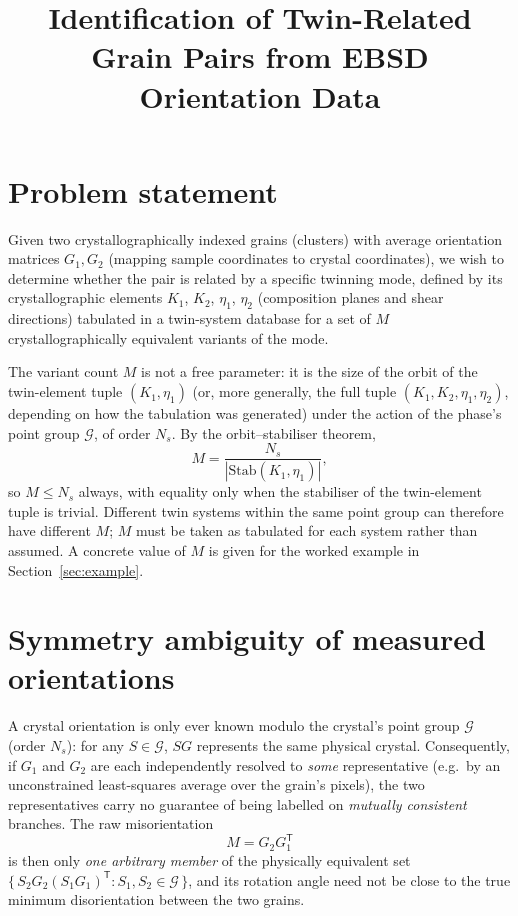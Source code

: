 \documentclass[11pt]{article}
\title{Identification of Twin-Related Grain Pairs from EBSD Orientation Data}
\author{}
\date{}
\newcommand{\Kone}{K_1}
\newcommand{\Ktwo}{K_2}
\newcommand{\etaone}{\eta_1}
\newcommand{\etatwo}{\eta_2}
\begin{document}
\maketitle

\section{Problem statement}

Given two crystallographically indexed grains (clusters) with average
orientation matrices $G_1, G_2$ (mapping sample coordinates to crystal
coordinates), we wish to determine whether the pair is related by a
specific twinning mode, defined by its crystallographic elements
$\Kone$, $\Ktwo$, $\etaone$, $\etatwo$ (composition planes and shear
directions) tabulated in a twin-system database for a set of $M$
crystallographically equivalent variants of the mode.

The variant count $M$ is not a free parameter: it is the size of the
orbit of the twin-element tuple $(\Kone,\etaone)$ (or, more generally,
the full tuple $(\Kone,\Ktwo,\etaone,\etatwo)$, depending on how the
tabulation was generated) under the action of the phase's point group
$\mathcal G$, of order $N_s$. By the orbit--stabiliser theorem,
\begin{equation}
  M = \frac{N_s}{|\mathrm{Stab}(\Kone,\etaone)|},
\end{equation}
so $M \le N_s$ always, with equality only when the stabiliser of the
twin-element tuple is trivial. Different twin systems within the same
point group can therefore have different $M$; $M$ must be taken as
tabulated for each system rather than assumed. A concrete value of $M$
is given for the worked example in Section~\ref{sec:example}.

\section{Symmetry ambiguity of measured orientations}

A crystal orientation is only ever known modulo the crystal's point group
$\mathcal{G}$ (order $N_s$): for any $S \in \mathcal{G}$, $S G$ represents
the same physical crystal. Consequently, if $G_1$ and $G_2$ are each
independently resolved to \emph{some} representative (e.g.\ by an
unconstrained least-squares average over the grain's pixels), the two
representatives carry no guarantee of being labelled on
\emph{mutually consistent} branches. The raw misorientation
\begin{equation}
  M = G_2 G_1^{\mathsf T}
\end{equation}
is then only \emph{one arbitrary member} of the physically equivalent set
$\{\, S_2 G_2 (S_1 G_1)^{\mathsf T} : S_1,S_2 \in \mathcal G \,\}$, and its
rotation angle need not be close to the true minimum disorientation
between the two grains.
\end{document}

